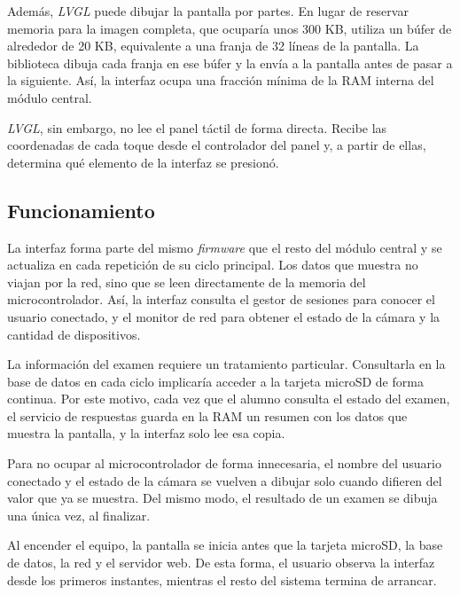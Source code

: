 Además, \emph{LVGL} puede dibujar la pantalla por partes. En lugar de reservar memoria para la imagen completa, que ocuparía unos 300 KB, utiliza un búfer de alrededor de 20 KB, equivalente a una franja de 32 líneas de la pantalla. La biblioteca dibuja cada franja en ese búfer y la envía a la pantalla antes de pasar a la siguiente. Así, la interfaz ocupa una fracción mínima de la RAM interna del módulo central.

\emph{LVGL}, sin embargo, no lee el panel táctil de forma directa. Recibe las coordenadas de cada toque desde el controlador del panel y, a partir de ellas, determina qué elemento de la interfaz se presionó.


\subsection{Funcionamiento}

La interfaz forma parte del mismo \emph{firmware} que el resto del módulo central y se actualiza en cada repetición de su ciclo principal. Los datos que muestra no viajan por la red, sino que se leen directamente de la memoria del microcontrolador. Así, la interfaz consulta el gestor de sesiones para conocer el usuario conectado, y el monitor de red para obtener el estado de la cámara y la cantidad de dispositivos.

La información del examen requiere un tratamiento particular. Consultarla en la base de datos en cada ciclo implicaría acceder a la tarjeta microSD de forma continua. Por este motivo, cada vez que el alumno consulta el estado del examen, el servicio de respuestas guarda en la RAM un resumen con los datos que muestra la pantalla, y la interfaz solo lee esa copia.

Para no ocupar al microcontrolador de forma innecesaria, el nombre del usuario conectado y el estado de la cámara se vuelven a dibujar solo cuando difieren del valor que ya se muestra. Del mismo modo, el resultado de un examen se dibuja una única vez, al finalizar.

Al encender el equipo, la pantalla se inicia antes que la tarjeta microSD, la base de datos, la red y el servidor web. De esta forma, el usuario observa la interfaz desde los primeros instantes, mientras el resto del sistema termina de arrancar.

